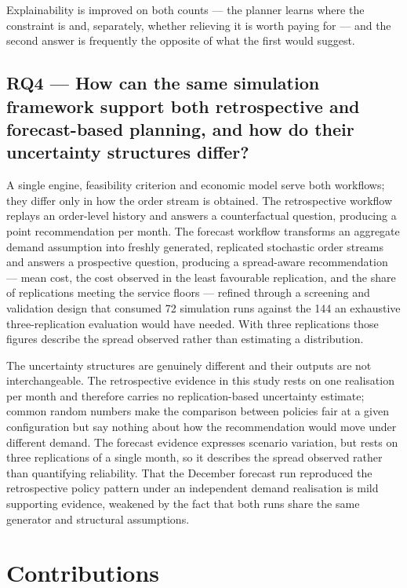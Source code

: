 Explainability is improved on both counts --- the planner learns where the constraint is and,
separately, whether relieving it is worth paying for --- and the second answer is frequently the
opposite of what the first would suggest.

\subsection*{RQ4 --- How can the same simulation framework support both retrospective and
forecast-based planning, and how do their uncertainty structures differ?}

A single engine, feasibility criterion and economic model serve both workflows; they differ only
in how the order stream is obtained. The retrospective workflow replays an order-level history
and answers a counterfactual question, producing a point recommendation per month. The forecast
workflow transforms an aggregate demand assumption into freshly generated, replicated stochastic
order streams and answers a prospective question, producing a spread-aware recommendation ---
mean cost, the cost observed in the least favourable replication, and the share of replications
meeting the service floors --- refined through a screening and validation design that consumed
72 simulation runs against the 144 an exhaustive three-replication evaluation would have needed.
With three replications those figures describe the spread observed rather than estimating a
distribution.

The uncertainty structures are genuinely different and their outputs are not interchangeable.
The retrospective evidence in this study rests on one realisation per month and therefore
carries no replication-based uncertainty estimate; common random numbers make the comparison
between policies fair at a given configuration but say nothing about how the recommendation
would move under different demand. The forecast evidence expresses scenario variation, but rests
on three replications of a single month, so it describes the spread observed rather than
quantifying reliability. That the December forecast run reproduced the retrospective policy pattern under
an independent demand realisation is mild supporting evidence, weakened by the fact that both
runs share the same generator and structural assumptions.

\section{Contributions}
\label{sec:conclusions-contributions}

